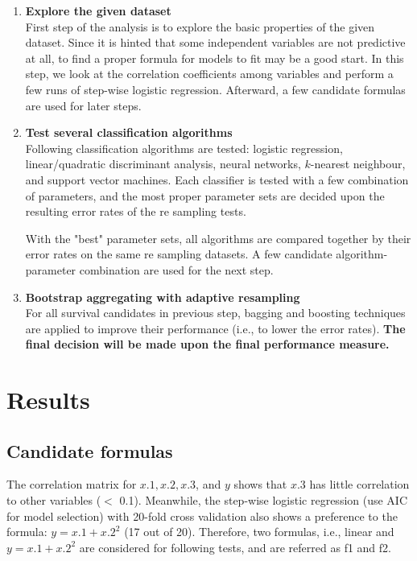 \documentclass[a4paper,12pt]{article}
\begin{document}
\begin{enumerate}
\item {\bf Explore the given dataset}\\
First step of the analysis is to explore the basic properties of the given dataset.  Since it is hinted that some independent variables are not predictive at all, to find a proper formula for models to fit may be a good start.  In this step, we look at the correlation coefficients among variables and perform a few runs of step-wise logistic regression.  Afterward, a few candidate formulas are used for later steps.

\item {\bf Test several classification algorithms} \\ 
  Following classification algorithms are tested: logistic regression, linear/quadratic discriminant analysis, neural networks, $k$-nearest neighbour, and support vector machines.  Each classifier is tested with a few combination of parameters, and the most proper parameter sets are decided upon the resulting error rates of the re sampling tests.

  With the "best" parameter sets, all algorithms are compared together by their error rates on the same re sampling datasets.  A few candidate algorithm-parameter combination are used for the next step.

\item {\bf Bootstrap aggregating with adaptive resampling}\\
For all survival candidates in previous step, bagging and boosting techniques are applied to improve their performance (i.e., to lower the error rates).  {\bf The final decision will be made upon the final performance measure.}

\end{enumerate}


\section{Results}
\subsection*{\bf Candidate formulas}
The correlation matrix for $x.1, x.2, x.3$, and $y$ shows that $x.3$ has little correlation to other variables ($<$ 0.1). Meanwhile, the step-wise logistic regression (use AIC for model selection) with 20-fold cross validation also shows a preference to the formula: $y = x.1 + x.2^2$ (17 out of 20).  Therefore, two formulas, i.e., linear and $y = x.1 + x.2^2$ are considered for following tests, and are referred as f1 and f2.
\end{document}
